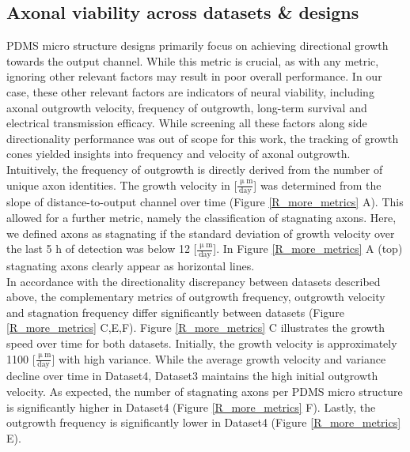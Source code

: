 \subsection{Axonal viability across datasets \& designs}
PDMS micro structure designs primarily focus on achieving directional growth
towards the output channel. While this metric is crucial, as with any metric,
ignoring other relevant factors may result in poor overall performance. In our
case, these other relevant factors are indicators of neural viability, including
axonal outgrowth velocity, frequency of outgrowth, long-term survival and
electrical transmission efficacy. While screening all these factors along
side directionality performance was out of scope for this work, the tracking of
growth cones yielded insights into frequency and velocity of axonal outgrowth.
Intuitively, the frequency of outgrowth is directly derived from the number of
unique axon identities. The growth velocity in
[$\frac{\mathrm{\upmu}\mathrm{m}}{\mathrm{day}}$] was determined from the slope
of distance-to-output channel over time (Figure \ref{R_more_metrics} A). This
allowed for a further metric, namely the classification of stagnating axons.
Here, we defined axons as stagnating if the standard deviation of growth
velocity over the last 5 h of detection was below 12
[$\frac{\mathrm{\upmu}\mathrm{m}}{\mathrm{day}}$]. In Figure
\ref{R_more_metrics} A (top) stagnating axons clearly appear as horizontal
lines. \\

In accordance with the directionality discrepancy between datasets described
above, the complementary metrics of outgrowth frequency, outgrowth velocity and
stagnation frequency differ significantly between datasets (Figure
\ref{R_more_metrics} C,E,F). Figure \ref{R_more_metrics} C illustrates the
growth speed over time for both datasets. Initially, the growth velocity is
approximately 1100 [$\frac{\mathrm{\upmu}\mathrm{m}}{\mathrm{day}}$] with high
variance. While the average growth velocity and variance decline over time in
Dataset4, Dataset3 maintains the high initial outgrowth velocity. As expected,
the number of stagnating axons per PDMS micro structure is significantly higher
in Dataset4 (Figure \ref{R_more_metrics} F). Lastly, the outgrowth frequency is
significantly lower in Dataset4 (Figure \ref{R_more_metrics} E). \\

